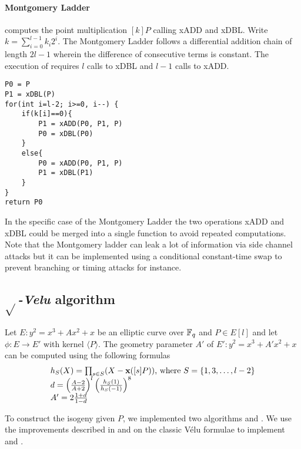 \documentclass[../main.tex]{subfiles}
\begin{document}
\paragraph{Montgomery Ladder}  computes the point multiplication $[k]P$ calling xADD and xDBL. Write $k=\sum_{i=0}^{l-1}k_i2^i$. The Montgomery Ladder follows a differential addition chain of length $2l-1$ wherein the difference of consecutive terms is constant. The execution of  requires $l$ calls to xDBL and $l-1$ calls to xADD.
\begin{verbatim}
P0 = P
P1 = xDBL(P)
for(int i=l-2; i>=0, i--) {
	if(k[i]==0){
		P1 = xADD(P0, P1, P)
		P0 = xDBL(P0)
	}
	else{
		P0 = xADD(P0, P1, P)
		P1 = xDBL(P1)
	}
}
return P0
\end{verbatim}
In the specific case of the Montgomery Ladder the two operations xADD and xDBL could be merged into a single function to avoid repeated computations.
Note that the Montgomery ladder can leak a lot of information via side channel attacks but it can be implemented using a conditional constant-time swap to prevent branching or timing attacks for instance.

\subsection{$\sqrt{}$\textit{-Velu} algorithm}

\begin{lemma}
	Let $E:y^2=x^3+Ax^2+x$ be an elliptic curve over $\mathbb{F}_q$ and $P\in E[l]$ and let $\phi:E\rightarrow E'$ with kernel $\langle P \rangle$.
	The geometry parameter $A'$ of $E' : y^2=x^3+A'x^2+x$ can be computed using the following formulas
	\begin{equation}\label{veluform}\begin{array}{l}
			h_S(X) = \prod_{s\in S}(X-\textbf{x}([s]P))\text{, where }S=\{1,3, \ldots, l-2\} \\
			d = \left(\frac{A-2}{A+2}\right)^l \left( \frac{h_S(1)}{h_S(-1)}\right)^8\\
			A'=2\frac{1+d}{1-d}
		\end{array}\end{equation}

\end{lemma}
To construct the isogeny given $P$, we implemented two algorithms  and . We use the improvements described in \cite{} and \cite{} on the classic Vélu formulae to implement  and .
\end{document}
